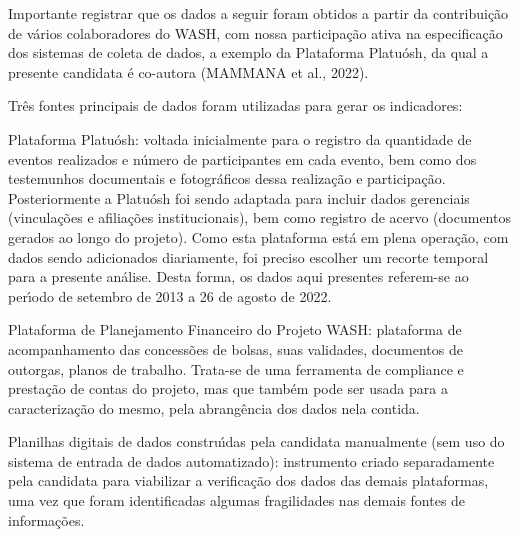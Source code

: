 \documentclass[
12pt,		%
openright,	%
twoside,  %
a4paper,			%
chapter=TITLE,		%
english,			%
french,				%
spanish,			%
brazil				%
]{USPSC-classe/USPSC}
\begin{document}
Importante registrar que os dados a seguir foram obtidos a partir da contribui\c{c}\~ao de v\'arios colaboradores do WASH, com nossa participa\c{c}\~ao ativa na especifica\c{c}\~ao dos sistemas de coleta de dados, a exemplo da Plataforma Platu\'osh, da qual a presente candidata \'e co-autora  (MAMMANA et al., 2022).














Tr\^es fontes principais de dados foram utilizadas para gerar os indicadores:















\begin{alineas}
\item Plataforma Platu\'osh: voltada inicialmente para o registro da quantidade de eventos realizados e n\'umero de participantes em cada evento, bem como dos testemunhos documentais e fotogr\'aficos dessa realiza\c{c}\~ao e participa\c{c}\~ao. Posteriormente a Platu\'osh foi sendo adaptada para incluir dados gerenciais (vincula\c{c}\~oes e afilia\c{c}\~oes institucionais), bem como registro de acervo (documentos gerados ao longo do projeto). Como esta plataforma est\'a em plena opera\c{c}\~ao, com dados sendo adicionados diariamente, foi preciso escolher um recorte temporal para a presente an\'alise. Desta forma, os dados aqui presentes referem-se ao per\'{\i}odo de setembro de 2013 a 26 de agosto de 2022.
\item Plataforma de Planejamento Financeiro do Projeto WASH: plataforma de acompanhamento das concess\~oes de bolsas, suas validades, documentos de outorgas, planos de trabalho. Trata-se de uma ferramenta de compliance e presta\c{c}\~ao de contas do projeto, mas que tamb\'em pode ser usada para a caracteriza\c{c}\~ao do mesmo, pela abrang\^encia dos dados nela contida.
\item Planilhas digitais de dados constru\'{\i}das pela candidata manualmente (sem uso do sistema de entrada de dados automatizado): instrumento criado separadamente pela candidata para viabilizar a verifica\c{c}\~ao dos dados das demais plataformas, uma vez que foram identificadas algumas fragilidades nas demais fontes de informa\c{c}\~oes.
\end{alineas}
\end{document}
